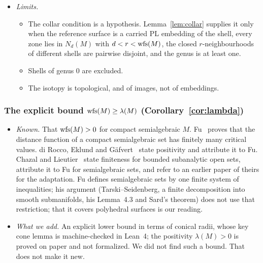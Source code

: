 \begin{itemize}
\begin{itemize}
  \end{itemize}
\item \emph{Limits.}
  \begin{itemize}
  \item The collar condition is a hypothesis. Lemma~\ref{lem:collar} supplies it only when the reference surface is a
  carried PL embedding of the shell, every zone lies in $N_d(M)$ with $d<r<\operatorname{wfs}(M)$, the closed $r$-neighbourhoods of
  different shells are pairwise disjoint, and the genus is at least one.
  \item Shells of genus $0$ are excluded.
  \item The isotopy is topological, and of images, not of embeddings.
  \end{itemize}
\end{itemize}

\subsubsection*{The explicit bound $\operatorname{wfs}(M)\ge\lambda(M)$ (Corollary~\ref{cor:lambda})}
\begin{itemize}
\item \emph{Known.} That $\operatorname{wfs}(M)>0$ for compact semialgebraic $M$. Fu~\cite[\S5.3]{Fu85}
proves that the distance function of a compact semialgebraic set has finitely many critical values. di Rocco, Eklund and
Gäfvert~\cite[Thm.~2.5]{dREG22} state positivity and attribute it to Fu. Chazal and
Lieutier~\cite[Prop.~3.6]{ChazalLieutier07} state finiteness for bounded subanalytic open sets, attribute it to Fu for
semialgebraic sets, and refer to an earlier paper of theirs for the adaptation. Fu defines semialgebraic sets by one
finite system of inequalities; his argument (Tarski--Seidenberg, a finite decomposition into smooth submanifolds, his
Lemma~4.3 and Sard's theorem) does not use that restriction; that it covers polyhedral surfaces is our reading.
\item \emph{What we add.} An explicit lower bound in terms of conical radii, whose key cone lemma is machine-checked in
Lean~4; the positivity $\lambda(M)>0$ is proved on paper and not formalized. We did not find such a bound. That does not
make it new.
\end{itemize}

